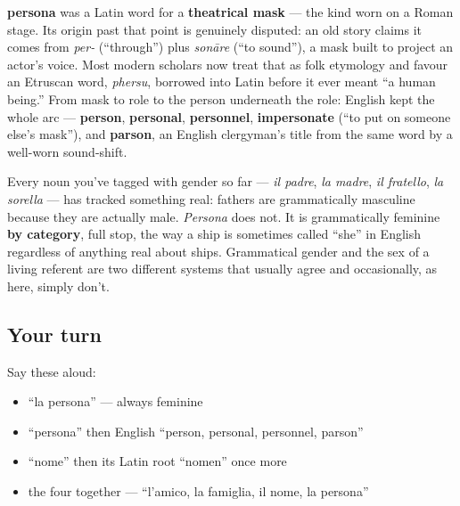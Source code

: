 \begin{cousinweb}
\textbf{persona} was a Latin word for a \textbf{theatrical mask} — the kind worn on a Roman stage. Its origin past that point is genuinely disputed: an old story claims it comes from \emph{per-} (\textquotedblleft{}through\textquotedblright{}) plus \emph{sonāre} (\textquotedblleft{}to sound\textquotedblright{}), a mask built to project an actor's voice. Most modern scholars now treat that as folk etymology and favour an Etruscan word, \emph{phersu}, borrowed into Latin before it ever meant \textquotedblleft{}a human being.\textquotedblright{} From mask to role to the person underneath the role: English kept the whole arc — \textbf{person}, \textbf{personal}, \textbf{personnel}, \textbf{impersonate} (\textquotedblleft{}to put on someone else's mask\textquotedblright{}), and \textbf{parson}, an English clergyman's title from the same word by a well-worn sound-shift.
\end{cousinweb}

\begin{grammarlens}[title={Grammar Lens: the word outranks the world}]
Every noun you've tagged with gender so far — \emph{il padre}, \emph{la madre}, \emph{il fratello}, \emph{la sorella} — has tracked something real: fathers are grammatically masculine because they are actually male. \emph{Persona} does not. It is grammatically feminine \textbf{by category}, full stop, the way a ship is sometimes called \textquotedblleft{}she\textquotedblright{} in English regardless of anything real about ships. Grammatical gender and the sex of a living referent are two different systems that usually agree and occasionally, as here, simply don't.
\end{grammarlens}

\subsection*{Your turn}
Say these aloud:

\begin{itemize}
\raggedright
  \item \textquotedblleft{}la persona\textquotedblright{} — always feminine
  \item \textquotedblleft{}persona\textquotedblright{} then English \textquotedblleft{}person, personal, personnel, parson\textquotedblright{}
  \item \textquotedblleft{}nome\textquotedblright{} then its Latin root \textquotedblleft{}nomen\textquotedblright{} once more
  \item the four together — \textquotedblleft{}l'amico, la famiglia, il nome, la persona\textquotedblright{}
\end{itemize}

